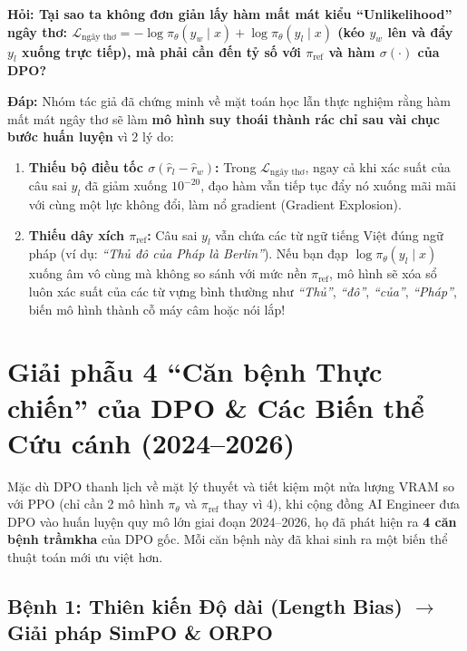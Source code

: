 \begin{debate}
\textbf{Hỏi: Tại sao ta không đơn giản lấy hàm mất mát kiểu ``Unlikelihood'' ngây thơ: $\mathcal{L}_{\text{ngây thơ}} = -\log \pi_\theta(y_w \mid x) + \log \pi_\theta(y_l \mid x)$ (kéo $y_w$ lên và đẩy $y_l$ xuống trực tiếp), mà phải cần đến tỷ số với $\pi_{\text{ref}}$ và hàm $\sigma(\cdot)$ của DPO?}

\textbf{Đáp:} Nhóm tác giả \citet{rafailov2023direct} đã chứng minh về mặt toán học lẫn thực nghiệm rằng hàm mất mát ngây thơ sẽ làm \textbf{mô hình suy thoái thành rác chỉ sau vài chục bước huấn luyện} vì 2 lý do:
\begin{enumerate}
  \item \textbf{Thiếu bộ điều tốc $\sigma(\hat{r}_l - \hat{r}_w)$:} Trong $\mathcal{L}_{\text{ngây thơ}}$, ngay cả khi xác suất của câu sai $y_l$ đã giảm xuống $10^{-20}$, đạo hàm vẫn tiếp tục đẩy nó xuống mãi mãi với cùng một lực không đổi, làm nổ gradient (Gradient Explosion).
  \item \textbf{Thiếu dây xích $\pi_{\text{ref}}$:} Câu sai $y_l$ vẫn chứa các từ ngữ tiếng Việt đúng ngữ pháp (ví dụ: \textit{``Thủ đô của Pháp là Berlin''}). Nếu bạn đạp $\log \pi_\theta(y_l \mid x)$ xuống âm vô cùng mà không so sánh với mức nền $\pi_{\text{ref}}$, mô hình sẽ xóa sổ luôn xác suất của các từ vựng bình thường như \textit{``Thủ''}, \textit{``đô''}, \textit{``của''}, \textit{``Pháp''}, biến mô hình thành cỗ máy câm hoặc nói lắp!
\end{enumerate}
\end{debate}

\section{Giải phẫu 4 ``Căn bệnh Thực chiến'' của DPO \& Các Biến thể Cứu cánh (2024–2026)}
\label{sec:dpo_pathologies}

Mặc dù DPO thanh lịch về mặt lý thuyết và tiết kiệm một nửa lượng VRAM so với PPO (chỉ cần 2 mô hình $\pi_\theta$ và $\pi_{\text{ref}}$ thay vì 4), khi cộng đồng AI Engineer đưa DPO vào huấn luyện quy mô lớn giai đoạn 2024--2026, họ đã phát hiện ra \textbf{4 căn bệnh trầmkha} của DPO gốc. Mỗi căn bệnh này đã khai sinh ra một biến thể thuật toán mới ưu việt hơn.

\subsection{Bệnh 1: Thiên kiến Độ dài (Length Bias) \texorpdfstring{$\longrightarrow$}{->} Giải pháp SimPO \& ORPO}

